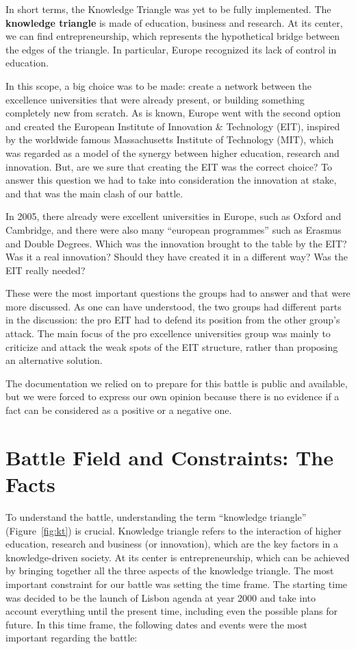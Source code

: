 \documentclass[11pt,a4paper,oneside,twocolumn]{IEEEtran}
\begin{document}
In short terms, the Knowledge Triangle was yet to be fully implemented. The \textbf{knowledge triangle} is made of education, business and research. At its center, we can find entrepreneurship, which represents the hypothetical bridge between the edges of the triangle. In particular, Europe recognized its lack of control in education.

In this scope, a big choice was to be made: create a network between the excellence universities that were already present, or building something completely new from scratch. As is known, Europe went with the second option and created the European Institute of Innovation \& Technology (EIT), inspired by the worldwide famous Massachusetts Institute of Technology (MIT), which was regarded as a model of the synergy between higher education, research and innovation. But, are we sure that creating the EIT was the correct choice? To answer this question we had to take into consideration the innovation at stake, and that was the main clash of our battle.

In 2005, there already were excellent universities in Europe, such as Oxford and Cambridge, and there were also many ``european programmes'' such as Erasmus and Double Degrees.
Which was the innovation brought to the table by the EIT?\@ Was it a real innovation? Should they have created it in a different way? Was the EIT really needed?

These were the most important questions the groups had to answer and that were more discussed. As one can have understood, the two groups had different parts in the discussion: the pro EIT had to defend its position from the other group’s attack. The main focus of the pro excellence universities group was mainly to criticize and attack the weak spots of the EIT structure, rather than proposing an alternative solution.

The documentation we relied on to prepare for this battle is public and available, but we were forced to express our own opinion because there is no evidence if a fact can be considered as a positive or a negative one.

\section{Battle Field and Constraints: The Facts}
To understand the battle, understanding the term ``knowledge triangle'' (Figure~\ref{fig:kt}) is crucial. Knowledge triangle refers to the interaction of higher education, research and business (or innovation), which are the key factors in a knowledge-driven society. At its center is entrepreneurship, which can be achieved by bringing together all the three aspects of the knowledge triangle.
The most important constraint for our battle was setting the time frame. The starting time was decided to be the launch of Lisbon agenda at year 2000 and take into account everything until the present time, including even the possible plans for future. In this time frame, the following dates and events were the most important regarding the battle:
\end{document}
